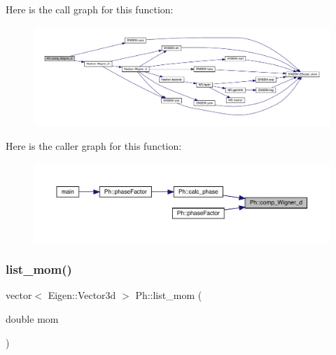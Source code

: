 Here is the call graph for this function\+:
\nopagebreak
\begin{figure}[H]
\begin{center}
\leavevmode
\includegraphics[width=350pt]{d6/d3c/namespacePh_a47fd4e2846a9ce86464940bc5f4cccf8_cgraph}
\end{center}
\end{figure}
Here is the caller graph for this function\+:
\nopagebreak
\begin{figure}[H]
\begin{center}
\leavevmode
\includegraphics[width=350pt]{d6/d3c/namespacePh_a47fd4e2846a9ce86464940bc5f4cccf8_icgraph}
\end{center}
\end{figure}
\mbox{\label{namespacePh_a54c2023181613e6aacf1ec346c11bf9a}} 
\subsubsection{\texorpdfstring{list\_mom()}{list\_mom()}}
{\footnotesize\ttfamily vector$<$ Eigen\+::\+Vector3d $>$ Ph\+::list\+\_\+mom (\begin{DoxyParamCaption}\item[{double}]{mom }\end{DoxyParamCaption})}

